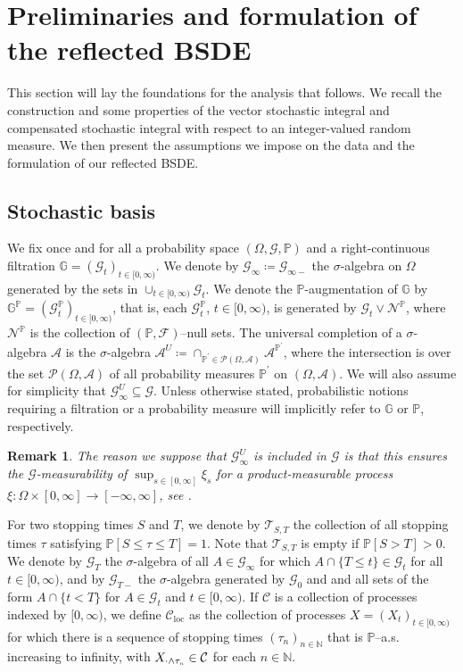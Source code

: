 \documentclass[10pt]{article} %
\newtheorem{remark}[theorem]{Remark}
\newcommand\cA{\mathcal A}
\newcommand\cC{\mathcal C}
\newcommand\cF{\mathcal F}
\newcommand\cG{\mathcal G}
\newcommand\cN{\mathcal N}
\newcommand\cT{\mathcal T}
\newcommand{\smalltext}[1]{\text{\fontsize{4}{4}\selectfont$#1$}}
\def \G{\mathbb{G}}
\def \N{\mathbb{N}}
\def \P{\mathbb{P}}
\def\Ac{\mathcal{A}}
\def\Pc{\mathcal{P}}
\newcommand{\1}{\mathbf{1}}
\begin{document}
\section{Preliminaries and formulation of the reflected BSDE}\label{sec::preliminaries}

This section will lay the foundations for the analysis that follows. We recall the construction and some properties of the vector stochastic integral and compensated stochastic integral with respect to an integer-valued random measure. We then present the assumptions we impose on the data and the formulation of our reflected BSDE.

\subsection{Stochastic basis}\label{sec::stochastic_basis}

We fix once and for all a probability space $(\Omega,\cG,\P)$ and a right-continuous filtration $\G = (\cG_t)_{t \in [0,\infty)}$. We denote by $\cG_\infty \coloneqq \cG_{\infty-}$ the $\sigma$-algebra on $\Omega$ generated by the sets in $\cup_{t \in [0,\infty)} \cG_t$. We denote the $\P$-augmentation of $\G$ by $\G^\P = (\cG^\P_t)_{t \in [0,\infty)}$, that is, each $\cG^\P_t$, $t \in [0,\infty)$, is generated by $\cG_t \lor \cN^\P$, where $\cN^\P$ is the collection of $(\P,\cF)$--null sets. The universal completion of a $\sigma$-algebra $\cA$ is the $\sigma$-algebra $\cA^U \coloneqq \cap_{\P^\prime\in\Pc(\Omega,\Ac)} \cA^{\P^\prime}$, where the intersection is over the set $\Pc(\Omega,\Ac)$ of all probability measures $\P^\prime$ on $(\Omega,\cA)$. We will also assume for simplicity that $\cG^U_\infty \subseteq \cG$. Unless otherwise stated, probabilistic notions requiring a filtration or a probability measure will implicitly refer to $\G$ or $\P$, respectively. 

\begin{remark}\label{rem::measurability_of_sup}
	The reason we suppose that $\cG^U_\infty$ is included in $\cG$ is that this ensures the $\cG$-measurability of $\sup_{s \in [0,\infty]} \xi_s$ for a product-measurable process $\xi : \Omega \times [0,\infty] \longrightarrow [-\infty,\infty]$, see {\rm\cite[Proposition 2.21]{karoui2013capacities}}.
\end{remark}

For two stopping times $S$ and $T$, we denote by $\cT_{S,T}$ the collection of all stopping times $\tau$ satisfying $\P[S \leq \tau \leq T] = 1$. Note that $\cT_{S,T}$ is empty if $\P[S > T] > 0$. We denote by $\cG_T$ the $\sigma$-algebra of all $A \in \cG_\infty$ for which $A \cap \{T \leq t\} \in \cG_t$ for all $t \in [0,\infty)$, and by $\cG_{T-}$ the $\sigma$-algebra generated by $\cG_0$ and and all sets of the form $A \cap \{t < T\}$ for $A \in \cG_t$ and $t \in [0,\infty)$.  If $\cC$ is a collection of processes indexed by $[0,\infty)$, we define $\cC_\mathrm{loc}$ as the collection of processes $X = (X_t)_{t \in [0,\infty)}$ for which there is a sequence of stopping times $(\tau_n)_{n \in \N}$ that is $\P$--a.s. increasing to infinity, with $X_{\cdot \land \tau_\smalltext{n}} \in \cC$ for each $n \in \N$.
\end{document}
